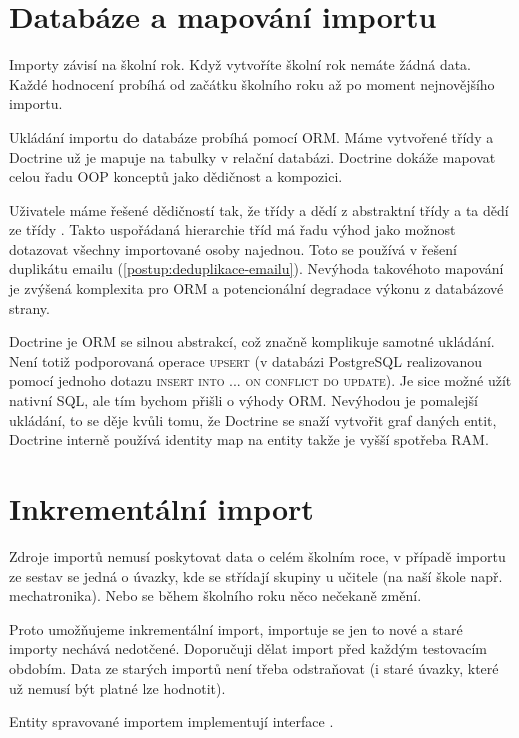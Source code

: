 \section{Databáze a mapování importu}

Importy závisí na školní rok. Když vytvoříte školní rok nemáte žádná data. Každé hodnocení probíhá od začátku školního roku až po moment nejnovějšího importu.

Ukládání importu do databáze probíhá pomocí ORM. Máme vytvořené třídy a Doctrine už je mapuje na tabulky v relační databázi. Doctrine dokáže mapovat celou řadu OOP konceptů jako dědičnost a kompozici.

Uživatele máme řešené dědičností tak, že třídy  a  dědí z abstraktní třídy  a ta dědí ze třídy . Takto uspořádaná hierarchie tříd má řadu výhod jako možnost dotazovat všechny importované osoby najednou.   Toto se používá v řešení duplikátu emailu (\ref{postup:deduplikace-emailu}). Nevýhoda takovéhoto mapování je zvýšená komplexita pro ORM a potencionální degradace výkonu z databázové strany.

Doctrine je ORM se silnou abstrakcí, což značně komplikuje samotné ukládání. Není totiž podporovaná operace \textsc{upsert} (v databázi PostgreSQL realizovanou pomocí jednoho dotazu \textsc{insert into ... on conflict do update}). Je sice možné užít nativní SQL, ale tím bychom přišli o výhody ORM.
Nevýhodou je pomalejší ukládání, to se děje kvůli tomu, že Doctrine se snaží vytvořit graf daných entit, Doctrine interně používá identity map na entity takže je vyšší spotřeba RAM.



\section{Inkrementální import}

Zdroje importů nemusí poskytovat data o celém školním roce, v případě importu ze sestav se jedná o úvazky, kde se střídají skupiny u učitele (na naší škole např. mechatronika).
 Nebo se během školního roku něco nečekaně změní.

Proto umožňujeme inkrementální import, importuje se jen to nové a staré importy nechává nedotčené. Doporučuji dělat import před každým testovacím obdobím. Data ze starých importů není třeba odstraňovat (i staré úvazky, které už nemusí být platné lze hodnotit). 

Entity spravované importem implementují interface .

